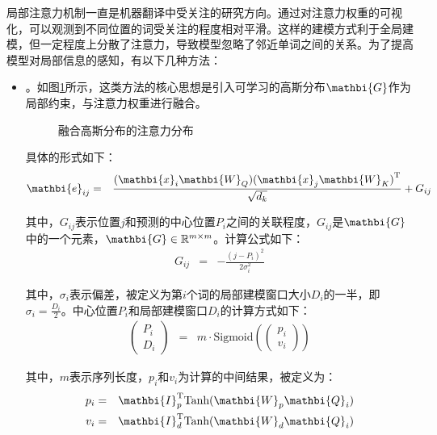\parinterval 局部注意力机制一直是机器翻译中受关注的研究方向。通过对注意力权重的可视化，可以观测到不同位置的词受关注的程度相对平滑。这样的建模方式利于全局建模，但一定程度上分散了注意力，导致模型忽略了邻近单词之间的关系。为了提高模型对局部信息的感知，有以下几种方法：

\begin{itemize}
\vspace{0.5em}
\item {\small{}}。如图\ref{fig:15-3}所示，这类方法的核心思想是引入可学习的高斯分布$\mathbi{G}$作为局部约束，与注意力权重进行融合。

\begin{figure}[htp]
\centering

\caption{融合高斯分布的注意力分布}
\label{fig:15-3}
\end{figure}

\noindent 具体的形式如下：
\begin{eqnarray}
\mathbi{e}_{ij} &=& \frac{(\mathbi{x}_i \mathbi{W}_Q){(\mathbi{x}_j \mathbi{W}_K)}^{\textrm{T}}}{\sqrt{d_k}} + G_{ij}
\label{eq:15-15}
\end{eqnarray}

\noindent 其中，$G_{ij}$表示位置$j$和预测的中心位置$P_i$之间的关联程度，$G_{ij}$是$\mathbi{G}$中的一个元素，$\mathbi{G} \in \mathbb{R}^{m\times m}$。计算公式如下：
\begin{eqnarray}
G_{ij} &=& - \frac{{(j - P_i)}^2}{2\sigma_i^2}
\label{eq:15-16}
\end{eqnarray}

\noindent 其中，$\sigma_i$表示偏差，被定义为第$i$个词的局部建模窗口大小$D_i$的一半，即$\sigma_i = \frac{D_i}{2}$。中心位置$P_i$和局部建模窗口$D_i$的计算方式如下：
\begin{eqnarray}
\begin{pmatrix} P_i \\ D_i \end{pmatrix} &=& m \cdot \textrm{Sigmoid}(\begin{pmatrix} p_i \\ v_i \end{pmatrix})
\label{eq:15-17}
\end{eqnarray}

\noindent 其中，$m$表示序列长度，$p_i$和$v_i$为计算的中间结果，被定义为：
\begin{eqnarray}
p_i &=& \mathbi{I}_p^{\textrm{T}}\textrm{Tanh}(\mathbi{W}_p\mathbi{Q}_i) \\
v_i &=& \mathbi{I}_d^{\textrm{T}}\textrm{Tanh}(\mathbi{W}_d\mathbi{Q}_i)
\label{eq:15-19}
\end{eqnarray}


\end{itemize}
